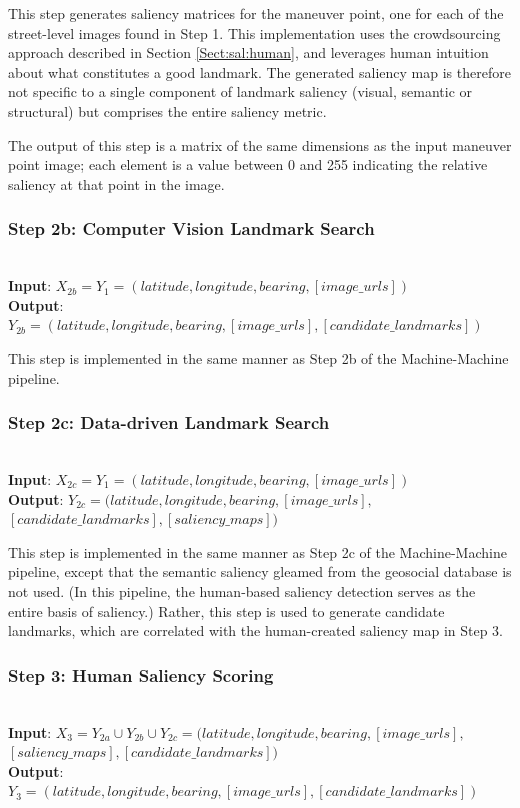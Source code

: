This step generates saliency matrices for the maneuver point, one for each of the street-level images found in Step 1. This implementation uses the crowdsourcing approach described in Section \ref{Sect:sal:human}, and leverages human intuition about what constitutes a good landmark. The generated saliency map is therefore not specific to a single component of landmark saliency (visual, semantic or structural) but comprises the entire saliency metric. 

The output of this step is a matrix of the same dimensions as the input maneuver point image; each element is a value between 0 and 255 indicating the relative saliency at that point in the image.

\subsubsection*{Step 2b: Computer Vision Landmark Search}~\\
\noindent\textbf{Input}: $X_{2b} = Y_1 = (latitude, longitude, bearing, [image\_urls])$\\
\textbf{Output}: $Y_{2b} = (latitude, longitude, bearing,  [image\_urls], [candidate\_landmarks] )$ 

This step is implemented in the same manner as Step 2b of the Machine-Machine pipeline.

\subsubsection*{Step 2c: Data-driven Landmark Search}~\\
\noindent\textbf{Input}: $X_{2c} = Y_1 = (latitude, longitude, bearing, [image\_urls])$\\
\textbf{Output}: $Y_{2c} = (latitude, longitude, bearing,  [image\_urls], $\\$[candidate\_landmarks], [saliency\_maps] )$ 

This step is implemented in the same manner as Step 2c of the Machine-Machine pipeline, except that the semantic saliency gleamed from the geosocial database is not used. (In this pipeline, the human-based saliency detection serves as the entire basis of saliency.) Rather, this step is used to generate candidate landmarks, which are correlated with the human-created saliency map in Step 3.

\subsubsection*{Step 3: Human Saliency Scoring}~\\
\noindent\textbf{Input}: $X_3 = Y_{2a} \cup Y_{2b} \cup Y_{2c} = (latitude, longitude, bearing,  [image\_urls],$\\$ [saliency\_maps], [candidate\_landmarks] )$\\
\textbf{Output}: $Y_3 = (latitude, longitude, bearing,  [image\_urls], [candidate\_landmarks] )$ 

